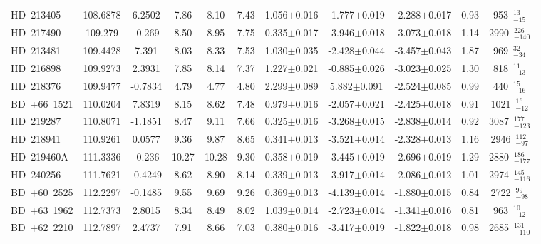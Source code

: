 {\begin{longtable}{lcccccccccc}
\noalign{\smallskip}
HD~213405 & 108.6878 & 6.2502 & 7.86 & 8.10 & 7.43 & 1.056$\pm$0.016 & -1.777$\pm$0.019 & -2.288$\pm$0.017 & 0.93 & 953~$_{-15}^{13}$ \\
\noalign{\smallskip}
HD~217490 & 109.279 & -0.269 & 8.50 & 8.95 & 7.75 & 0.335$\pm$0.017 & -3.946$\pm$0.018 & -3.073$\pm$0.018 & 1.14 & 2990~$_{-140}^{226}$ \\
\noalign{\smallskip}
HD~213481 & 109.4428 & 7.391 & 8.03 & 8.33 & 7.53 & 1.030$\pm$0.035 & -2.428$\pm$0.044 & -3.457$\pm$0.043 & 1.87 & 969~$_{-34}^{32}$ \\
\noalign{\smallskip}
HD~216898 & 109.9273 & 2.3931 & 7.85 & 8.14 & 7.37 & 1.227$\pm$0.021 & -0.885$\pm$0.026 & -3.023$\pm$0.025 & 1.30 & 818~$_{-13}^{11}$ \\
\noalign{\smallskip}
HD~218376 & 109.9477 & -0.7834 & 4.79 & 4.77 & 4.80 & 2.299$\pm$0.089 & 5.882$\pm$0.091 & -2.524$\pm$0.085 & 0.99 & 440~$_{-16}^{15}$ \\
\noalign{\smallskip}
BD~+66~1521 & 110.0204 & 7.8319 & 8.15 & 8.62 & 7.48 & 0.979$\pm$0.016 & -2.057$\pm$0.021 & -2.425$\pm$0.018 & 0.91 & 1021~$_{-12}^{16}$ \\
\noalign{\smallskip}
HD~219287 & 110.8071 & -1.1851 & 8.47 & 9.11 & 7.66 & 0.325$\pm$0.016 & -3.268$\pm$0.015 & -2.838$\pm$0.014 & 0.92 & 3087~$_{-123}^{177}$ \\
\noalign{\smallskip}
HD~218941 & 110.9261 & 0.0577 & 9.36 & 9.87 & 8.65 & 0.341$\pm$0.013 & -3.521$\pm$0.014 & -2.328$\pm$0.013 & 1.16 & 2946~$_{-97}^{112}$ \\
\noalign{\smallskip}
HD~219460A & 111.3336 & -0.236 & 10.27 & 10.28 & 9.30 & 0.358$\pm$0.019 & -3.445$\pm$0.019 & -2.696$\pm$0.019 & 1.29 & 2880~$_{-177}^{186}$ \\
\noalign{\smallskip}
HD~240256 & 111.7621 & -0.4249 & 8.62 & 8.90 & 8.14 & 0.339$\pm$0.013 & -3.917$\pm$0.014 & -2.086$\pm$0.012 & 1.01 & 2974~$_{-116}^{145}$ \\
\noalign{\smallskip}
BD~+60~2525 & 112.2297 & -0.1485 & 9.55 & 9.69 & 9.26 & 0.369$\pm$0.013 & -4.139$\pm$0.014 & -1.880$\pm$0.015 & 0.84 & 2722~$_{-98}^{99}$ \\
\noalign{\smallskip}
BD~+63~1962 & 112.7373 & 2.8015 & 8.34 & 8.49 & 8.02 & 1.039$\pm$0.014 & -2.723$\pm$0.014 & -1.341$\pm$0.016 & 0.81 & 963~$_{-12}^{10}$ \\
\noalign{\smallskip}
BD~+62~2210 & 112.7897 & 2.4737 & 7.91 & 8.66 & 7.03 & 0.380$\pm$0.016 & -3.417$\pm$0.019 & -1.822$\pm$0.018 & 0.98 & 2685~$_{-110}^{131}$ \\

\end{longtable}}

